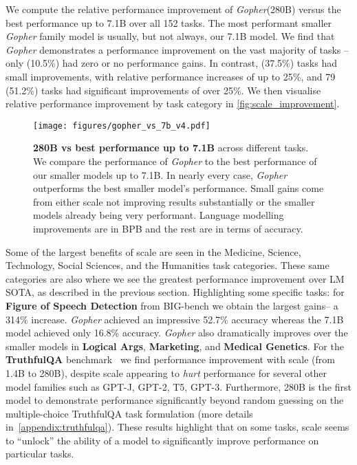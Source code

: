 \documentclass[11pt, a4paper, logo, internal, copyright, nonumbering]{deepmind}
\newcommand{\gopher}{\textit{Gopher}\xspace}
\newcommand{\bigbench}{BIG-bench\xspace}
\begin{document}
We compute the relative performance improvement of \gopher (280B) versus the best performance up to 7.1B over all 152 tasks. 
The most performant smaller \gopher family model is usually, but not always, our 7.1B model. 
We find that \gopher demonstrates a performance improvement on the vast majority of tasks -- only  (10.5\%) had zero or no performance gains.
In contrast,  (37.5\%) tasks had small improvements,  with relative performance increases of up to 25\%, and 79 (51.2\%) tasks had significant improvements of over 25\%. We then visualise relative performance improvement by task category in \autoref{fig:scale_improvement}.
\begin{figure}[t]
    \centering
    \texttt{[image: figures/gopher\_vs\_7b\_v4.pdf]}
    \caption{\textbf{280B vs best performance up to 7.1B} across different tasks.
    We compare the performance of \gopher to the best performance of our smaller models up to 7.1B. 
    In nearly every case, \gopher outperforms the best smaller model's performance. Small gains come from either scale not improving results substantially or the smaller models already being very performant.
    Language modelling improvements are in BPB and the rest are in terms of accuracy.}
    \label{fig:scale_improvement}
\end{figure}


Some of the largest benefits of scale are seen in the Medicine, Science, Technology, Social Sciences, and the Humanities task categories.
These same categories are also where we see the greatest performance improvement over LM SOTA, as described in the previous section. Highlighting some specific tasks:
for \textbf{Figure of Speech Detection} from \bigbench we obtain the largest gains-- a 314\% increase.
\gopher achieved an impressive 52.7\% accuracy whereas the 7.1B model achieved only 16.8\% accuracy.
\gopher also dramatically improves over the smaller models in \textbf{Logical Args}, \textbf{Marketing}, and \textbf{Medical Genetics}.
For the \textbf{TruthfulQA} benchmark~\citep{truthfulqa} we find performance improvement with scale (from 1.4B to 280B), despite scale appearing to \textit{hurt} performance for several other model families such as GPT-J, GPT-2, T5, GPT-3. Furthermore, 280B is the first model to demonstrate performance significantly beyond random guessing on the multiple-choice TruthfulQA task formulation (more details in~\autoref{appendix:truthfulqa}).
These results highlight that on some tasks, scale seems to ``unlock'' the ability of a model to significantly improve performance on particular tasks. 
\end{document}
